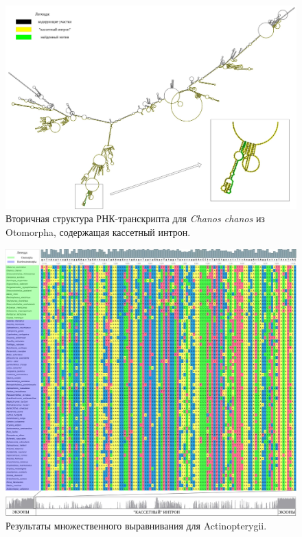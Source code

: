 \begin{figure}[h] %
    \centering
    \includegraphics[width=1.0\textwidth]{images/Chanos_chanos_2nd_structure}
    \caption{Вторичная структура РНК-транскрипта для \textit{Chanos chanos} из Otomorpha, содержащая кассетный интрон.}
    \label{fig:Chanos_chanos_2nd_structure}
\end{figure}

\begin{figure}[h] %
    \centering
    \includegraphics[width=1.0\textwidth]{images/Actinopterygii_alignment_ruler}
    \caption{Результаты множественного выравнивания для Actinopterygii.}
    \label{fig:Actinopterygii_alignment_ruler}
\end{figure}


